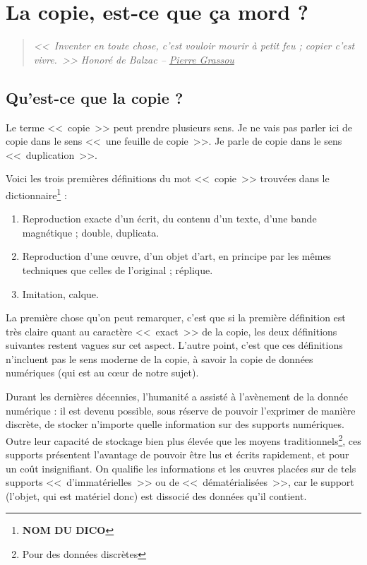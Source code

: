 \chapter{La copie, est-ce que ça mord ?}

\begin{quote}
\textit{{\Large <<~Inventer en toute chose, c'est vouloir mourir à petit feu ; copier c'est vivre.~>>} \hspace{25pt}Honoré de Balzac -- \underline{Pierre Grassou}}
\end{quote}

\section{Qu'est-ce que la copie ?}

Le terme <<~copie~>> peut prendre plusieurs sens. Je ne vais pas parler ici de copie dans le sens <<~une feuille de copie~>>. Je parle de copie dans le sens <<~duplication~>>.

Voici les trois premières définitions du mot <<~copie~>> trouvées dans le dictionnaire\footnote{\textbf{NOM DU DICO}} :
\begin{enumerate}
\item Reproduction exacte d'un écrit, du contenu d'un texte, d'une bande magnétique ; double, duplicata.
\item Reproduction d'une œuvre, d'un objet d'art, en principe par les mêmes techniques que celles de l'original ; réplique.
\item Imitation, calque.
\end{enumerate}\bigskip

La première chose qu'on peut remarquer, c'est que si la première définition est très claire quant au caractère <<~exact~>> de la copie, les deux définitions suivantes restent vagues sur cet aspect.
L'autre point, c'est que ces définitions n'incluent pas le sens moderne de la copie, à savoir la copie de données numériques (qui est au cœur de notre sujet).

Durant les dernières décennies, l'humanité a assisté à l'avènement de la donnée numérique : il est devenu possible, sous réserve de pouvoir l'exprimer de manière discrète, de stocker n'importe quelle information sur des supports numériques.
Outre leur capacité de stockage bien plus élevée que les moyens traditionnels\footnote{Pour des données discrètes}, ces supports présentent l'avantage de pouvoir être lus et écrits rapidement, et pour un coût insignifiant.
On qualifie les informations et les œuvres placées sur de tels supports <<~d'immatérielles~>> ou de <<~dématérialisées~>>, car le support (l'objet, qui est matériel donc) est dissocié des données qu'il contient.

